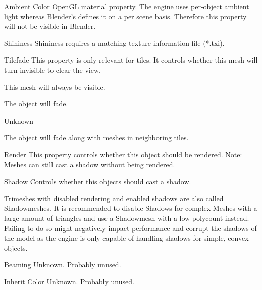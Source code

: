 \begin{property}{Ambient Color}
OpenGL material property. The engine uses per-object ambient light whereas Blender's 
defines it on a per scene basis. Therefore this property will not be visible in Blender.
\end{property}

\begin{property}{Shininess}
Shininess requires a matching texture information file (*.txi).
\end{property}

\begin{property}{Tilefade}
This property is only relevant for tiles. It controls whether this 
mesh will turn invisible to clear the view.
\begin{description}[leftmargin=6em,style=nextline]
    \item[None] This mesh will always be visible.
    \item[Fade] The object will fade.
    \item[Base] Unknown
    \item[Neighbour] The object will fade along with meshes in neighboring tiles.
\end{description}
\end{property}

\begin{property}{Render}
This property controls whether this object should be rendered. Note: Meshes can still
cast a shadow without being rendered.
\end{property}

\begin{property}{Shadow}
Controls whether this objects should cast a shadow. 

Trimeshes with disabled rendering and enabled shadows are also called Shadowmeshes.
It is recommended to disable Shadows for complex Meshes with a 
large amount of triangles and use a Shadowmesh with a low polycount instead. 
Failing to do so might negatively impact performance and corrupt the shadows of the 
model as the engine is only capable of handling shadows for simple, convex objects.
\end{property}

\begin{property}{Beaming}
Unknown. Probably unused.
\end{property}

\begin{property}{Inherit Color}
Unknown. Probably unused.
\end{property}

